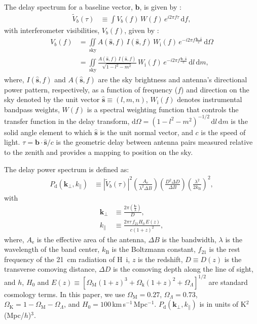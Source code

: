 \documentclass[preprint2,apjl,numberedappendix,twocolappendix,appendixfloats]{emulateapj}
\newcommand{\dif}{\mathrm{d}}
\begin{document}
The delay spectrum for a baseline vector, $\boldsymbol{b}$, is given by \citep{par12a,par12b,thy13,thy15}: 
\begin{align}
  \tilde{V}_b(\tau) &\equiv \int V_b(f)\,W(f)\,e^{i2\pi f\tau}\,\dif f,
\end{align}
with interferometer visibilities, $V_b(f)$, given by \citep{van34,zer38,tho01}:
\begin{align} 
  V_b(f) &= \iint\limits_\textrm{sky} A(\hat{\boldsymbol{s}},f)\,I(\hat{\boldsymbol{s}},f)\,W_\textrm{i}(f)\,e^{-i2\pi f\frac{\boldsymbol{b}\cdot\hat{\boldsymbol{s}}}{c}}\,\dif\Omega \\
         &= \iint\limits_\textrm{sky} \frac{A(\hat{\boldsymbol{s}},f)\,I(\hat{\boldsymbol{s}},f)}{\sqrt{1-l^2-m^2}}\,W_\textrm{i}(f)\,e^{-i2\pi f\frac{\boldsymbol{b}\cdot\hat{\boldsymbol{s}}}{c}}\,\dif l\,\dif m, 
\end{align}
where, $I(\hat{\boldsymbol{s}},f)$ and $A(\hat{\boldsymbol{s}},f)$ are the sky brightness and antenna's directional power pattern, respectively, as a function of frequency ($f$) and direction on the sky denoted by the unit vector $\hat{\boldsymbol{s}}\equiv (l,m,n)$, $W_\textrm{i}(f)$ denotes instrumental bandpass weights, $W(f)$ is a spectral weighting function that controls the transfer function in the delay transform, $\dif\Omega=(1-l^2-m^2)^{-1/2}\,\dif l\,\dif m$ is the solid angle element to which $\hat{\boldsymbol{s}}$ is the unit normal vector, and $c$ is the speed of light. $\tau=\boldsymbol{b}\cdot\hat{\boldsymbol{s}}/c$ is the geometric delay between antenna pairs measured relative to the zenith and provides a mapping to position on the sky.

The delay power spectrum is defined as:
\begin{align}\label{eqn:delay-power-spectrum}
  P_\textrm{d}(\boldsymbol{k}_\perp,k_\parallel) &\equiv |\tilde{V}_b(\tau)|^2\left(\frac{A_\textrm{e}}{\lambda^2\Delta B}\right)\left(\frac{D^2\Delta D}{\Delta B}\right)\left(\frac{\lambda^2}{2k_\textrm{B}}\right)^2,
\end{align}
with
\begin{align}
  \boldsymbol{k}_\perp &\equiv \frac{2\pi(\frac{\boldsymbol{b}}{\lambda})}{D}, \\
  k_\parallel &\equiv \frac{2\pi\tau\,f_{21}H_0\,E(z)}{c(1+z)^2}, 
\end{align}
where, $A_\textrm{e}$ is the effective area of the antenna, $\Delta B$ is the bandwidth, $\lambda$ is the wavelength of the band center, $k_\textrm{B}$ is the Boltzmann constant, $f_{21}$ is the rest frequency of the 21~cm radiation of H~{\sc i}, $z$ is the redshift, $D\equiv D(z)$ is the transverse comoving distance, $\Delta D$ is the comoving depth along the line of sight, and $h$, $H_0$ and $E(z)\equiv [\Omega_\textrm{M}(1+z)^3+\Omega_\textrm{k}(1+z)^2+\Omega_\Lambda]^{1/2}$ are standard cosmology terms. In this paper, we use $\Omega_\textrm{M}=0.27$, $\Omega_\Lambda=0.73$, $\Omega_\textrm{K}=1-\Omega_\textrm{M}-\Omega_\Lambda$, and $H_0=100\,$km$\,$s$^{-1}\,$Mpc$^{-1}$. $P_\textrm{d}(\boldsymbol{k}_\perp,k_\parallel)$ is in units of K$^2$(Mpc/$h$)$^3$.
\end{document}
